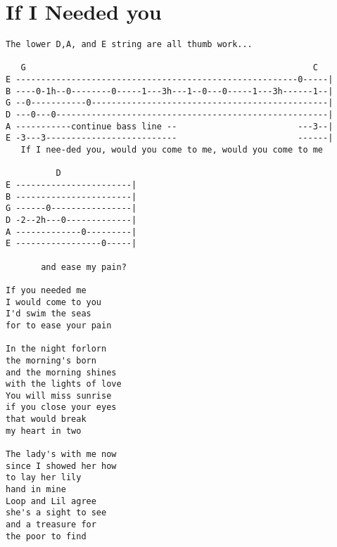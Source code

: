 \documentclass[leqno]{memoir}
\begin{document}
\chapter{If I Needed you}
\begin{verbatim}
The lower D,A, and E string are all thumb work...

   G                                                         C
E --------------------------------------------------------0-----|
B ----0-1h--0--------0-----1---3h---1--0---0-----1---3h------1--|
G --0-----------0-----------------------------------------------|
D ---0---0------------------------------------------------------|
A -----------continue bass line --                        ---3--|
E -3---3--------------------------                        ------|
   If I nee-ded you, would you come to me, would you come to me

          D
E -----------------------|
B -----------------------|
G ------0----------------|
D -2--2h---0-------------|
A -------------0---------|
E -----------------0-----|

       and ease my pain?

If you needed me
I would come to you
I'd swim the seas
for to ease your pain

In the night forlorn
the morning's born
and the morning shines
with the lights of love
You will miss sunrise
if you close your eyes
that would break
my heart in two

The lady's with me now
since I showed her how
to lay her lily
hand in mine
Loop and Lil agree
she's a sight to see
and a treasure for
the poor to find
\end{verbatim}
\newpage
\end{document}
